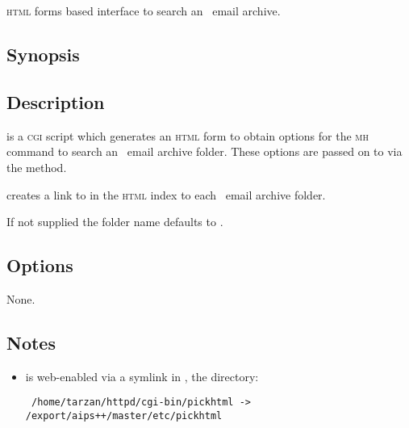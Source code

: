 \newpage
\section{}
\label{pickhtml}



\textsc{html} forms based interface to search an \aipspp\ email archive.

\subsection*{Synopsis}

\begin{synopsis}
\end{synopsis}

\subsection*{Description}

 is a \textsc{cgi} script which generates an \textsc{html} form
to obtain options for the \textsc{mh}  command to search an
\aipspp\ email archive folder.  These options are passed on to
 via the  method.

 creates a link to  in the \textsc{html} index
to each \aipspp\ email archive folder.

If not supplied the folder name defaults to .

\subsection*{Options}

None.

\subsection*{Notes}

\begin{itemize}
\item
    is web-enabled via a symlink in
   , the  
   directory:

\begin{verbatim}
 /home/tarzan/httpd/cgi-bin/pickhtml -> /export/aips++/master/etc/pickhtml
\end{verbatim}
\end{itemize}

